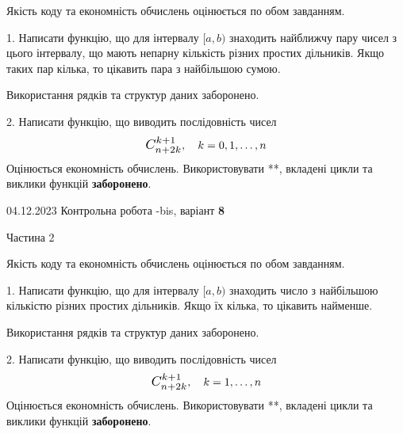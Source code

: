 \documentclass[12pt, ukrainian]{article}
\begin{document}
{{{{{{{
\begin {Large}
Якість коду та економність обчислень оцінюється по обом завданням. 

\vspace{5mm}

1. Написати функцію, що для інтервалу $[a, b)$ знаходить найближчу пару чисел з цього інтервалу, що мають непарну кількість різних простих дільників. Якщо таких пар кілька, то цікавить пара з найбільшою сумою.

 Використання рядків та структур даних заборонено. 



\vspace{10mm}



2. 
Написати функцію, що виводить послідовність чисел
$$\scalebox{1.2}{$C_{n+2k}^{k+1}$}, \quad k=0,1,\ldots,n$$
Оцінюється економність обчислень. Використовувати **, вкладені цикли та виклики функцій \textbf{заборонено}.

\end{Large}\newpage




\begin {Huge}
{{04.12.2023 Контрольна робота -bis, варіант  \No \textbf { 8 }\par}}

\begin{center}Частина 2
\end{center}
\vspace{10mm}
\end {Huge}

{
\begin {Large}
Якість коду та економність обчислень оцінюється по обом завданням. 

\vspace{5mm}

1. Написати функцію, що для інтервалу $[a, b)$ знаходить число з найбільшою кількістю різних простих дільників. Якщо їх кілька, то цікавить найменше.

 Використання рядків та структур даних заборонено. 



\vspace{10mm}



2. 
Написати функцію, що виводить послідовність чисел
$$\scalebox{1.2}{$C_{n+2k}^{k+1}$}, \quad k=1,\ldots,n$$
Оцінюється економність обчислень. Використовувати **, вкладені цикли та виклики функцій \textbf{заборонено}.


\end{Large}}}}}}}}}
\end{document}
